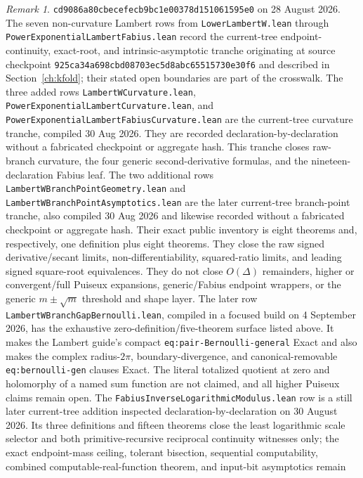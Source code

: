 \documentclass[11pt,oneside]{article}
\theoremstyle{definition}
\theoremstyle{remark}
\newtheorem{remark}[theorem]{Remark}
\begin{document}
\begin{remark}
\nolinkurl{cd9086a80cbecefecb9bc1e00378d151061595e0} on 28 August 2026.
The seven non-curvature Lambert rows from \nolinkurl{LowerLambertW.lean}
through \nolinkurl{PowerExponentialLambertFabius.lean} record the
current-tree endpoint-continuity, exact-root, and intrinsic-asymptotic
tranche originating at source checkpoint
\nolinkurl{925ca34a698cbd08703ec5d8abc65515730e30f6} and described in
Section~\ref{ch:kfold}; their stated open boundaries are part of the
crosswalk.  The three added rows
\nolinkurl{LambertWCurvature.lean},
\nolinkurl{PowerExponentialLambertCurvature.lean}, and
\nolinkurl{PowerExponentialLambertFabiusCurvature.lean} are the current-tree
curvature tranche, compiled 30 Aug 2026.  They are recorded
declaration-by-declaration without a fabricated checkpoint or aggregate
hash.  This tranche closes raw-branch curvature, the four generic
second-derivative formulas, and the nineteen-declaration Fabius leaf.
The two additional rows
\nolinkurl{LambertWBranchPointGeometry.lean} and
\nolinkurl{LambertWBranchPointAsymptotics.lean} are the later current-tree
branch-point tranche, also compiled 30 Aug 2026 and likewise recorded
without a fabricated checkpoint or aggregate hash.  Their exact public
inventory is eight theorems and, respectively, one definition plus eight
theorems.  They close the raw signed derivative/secant limits,
non-differentiability, squared-ratio limits, and leading signed square-root
equivalences.  They do not close \(O(\Delta)\) remainders, higher or
convergent/full Puiseux expansions, generic/Fabius endpoint wrappers, or
the generic \(m\mathbin{\pm}\sqrt m\) threshold and shape layer.
The later row
\nolinkurl{LambertWBranchGapBernoulli.lean}, compiled in a focused build on
4 September 2026, has the exhaustive zero-definition/five-theorem surface
listed above.  It makes the Lambert guide's compact
\nolinkurl{eq:pair-Bernoulli-general} Exact and also makes the complex
radius-\(2\pi\), boundary-divergence, and canonical-removable
\nolinkurl{eq:bernoulli-gen} clauses Exact.  The literal totalized quotient at
zero and holomorphy of a named sum function are not claimed, and all higher
Puiseux claims remain open.
The \nolinkurl{FabiusInverseLogarithmicModulus.lean} row is a still later
current-tree addition inspected declaration-by-declaration on 30 August 2026.
Its three definitions and fifteen theorems close the least logarithmic scale
selector and both primitive-recursive reciprocal continuity witnesses only;
the exact endpoint-mass ceiling, tolerant bisection, sequential computability,
combined computable-real-function theorem, and input-bit asymptotics remain

\end{remark}
\end{document}
